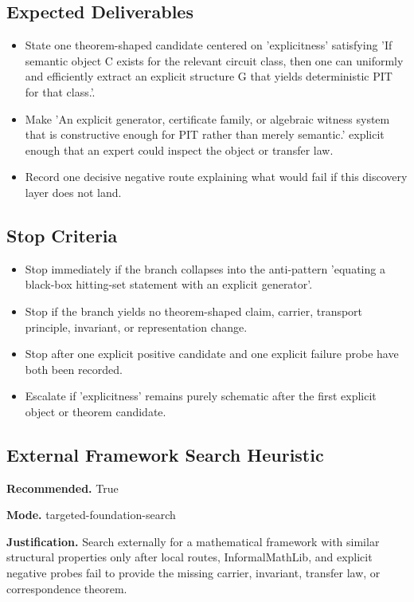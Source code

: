 \documentclass[11pt]{article}
\begin{document}
\subsection*{Expected Deliverables}
\begin{itemize}[leftmargin=*,itemsep=0.2em]
\item State one theorem-shaped candidate centered on 'explicitness' satisfying 'If semantic object C exists for the relevant circuit class, then one can uniformly and efficiently extract an explicit structure G that yields deterministic PIT for that class.'.
\item Make 'An explicit generator, certificate family, or algebraic witness system that is constructive enough for PIT rather than merely semantic.' explicit enough that an expert could inspect the object or transfer law.
\item Record one decisive negative route explaining what would fail if this discovery layer does not land.
\end{itemize}
\subsection*{Stop Criteria}
\begin{itemize}[leftmargin=*,itemsep=0.2em]
\item Stop immediately if the branch collapses into the anti-pattern 'equating a black-box hitting-set statement with an explicit generator'.
\item Stop if the branch yields no theorem-shaped claim, carrier, transport principle, invariant, or representation change.
\item Stop after one explicit positive candidate and one explicit failure probe have both been recorded.
\item Escalate if 'explicitness' remains purely schematic after the first explicit object or theorem candidate.
\end{itemize}
\subsection*{External Framework Search Heuristic}
\textbf{Recommended.} True

\textbf{Mode.} targeted-foundation-search

\textbf{Justification.} Search externally for a mathematical framework with similar structural properties only after local routes, InformalMathLib, and explicit negative probes fail to provide the missing carrier, invariant, transfer law, or correspondence theorem.
\end{document}

